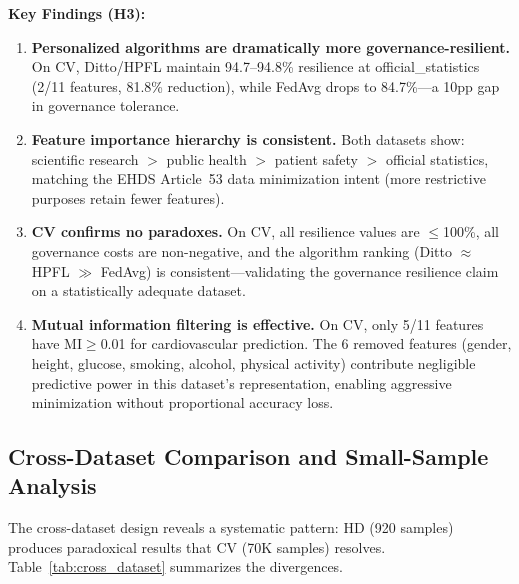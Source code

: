 \documentclass[conference]{IEEEtran}
\begin{document}
\noindent\textbf{Key Findings (H3):}
\begin{enumerate}
    \item \textbf{Personalized algorithms are dramatically more governance-resilient.} On CV, Ditto/HPFL maintain 94.7--94.8\% resilience at official\_statistics (2/11 features, 81.8\% reduction), while FedAvg drops to 84.7\%---a 10pp gap in governance tolerance.
    \item \textbf{Feature importance hierarchy is consistent.} Both datasets show: scientific research $>$ public health $>$ patient safety $>$ official statistics, matching the EHDS Article~53 data minimization intent (more restrictive purposes retain fewer features).
    \item \textbf{CV confirms no paradoxes.} On CV, all resilience values are $\leq$100\%, all governance costs are non-negative, and the algorithm ranking (Ditto $\approx$ HPFL $\gg$ FedAvg) is consistent---validating the governance resilience claim on a statistically adequate dataset.
    \item \textbf{Mutual information filtering is effective.} On CV, only 5/11 features have MI$\geq$0.01 for cardiovascular prediction. The 6 removed features (gender, height, glucose, smoking, alcohol, physical activity) contribute negligible predictive power in this dataset's representation, enabling aggressive minimization without proportional accuracy loss.
\end{enumerate}

\subsection{Cross-Dataset Comparison and Small-Sample Analysis}
\label{sec:cross_dataset}

The cross-dataset design reveals a systematic pattern: HD (920 samples) produces paradoxical results that CV (70K samples) resolves. Table~\ref{tab:cross_dataset} summarizes the divergences.
\end{document}
